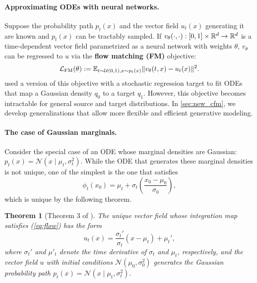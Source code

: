 \documentclass[10pt]{article}
\theoremstyle{plain}
\newtheorem{theorem}{Theorem}[section]
\theoremstyle{definition}
\theoremstyle{remark}
\newcommand{\LFM}[0]{\gL_{\rm FM}}
\begin{document}
\paragraph{Approximating ODEs with neural networks.} Suppose the probability path $p_t(x)$ and the vector field $u_t(x)$ generating it are known and $p_t(x)$ can be tractably sampled. If $v_\theta(\cdot,\cdot):[0,1]\times\mathbb{R}^d\to\mathbb{R}^d$ is a time-dependent vector field parametrized as a neural network with weights $\theta$, $v_\theta$ can be regressed to $u$ via the \textbf{flow matching (FM)} objective:
\begin{equation}\label{eq:fm}
\LFM(\theta) := \E_{t\sim {\gU(0,1)},x\sim p_t(x)} \| v_\theta(t, x) - u_t(x) \|^2.
\end{equation}
\citet{lipman_flow_2022} used a version of this objective with a stochastic regression target to fit ODEs that map a Gaussian density $q_0$ to a target $q_1$. However, this objective becomes intractable for general source and target distributions. In \autoref{sec:new_cfm}, we develop generalizations that allow more flexible and efficient generative modeling.

\paragraph{The case of Gaussian marginals.}
Consider the special case of an ODE whose marginal densities are Gaussian: $p_t(x) = \mathcal{N}(x \mid \mu_t, \sigma_t^2)$. While the ODE that generates these marginal densities is not unique, one of the simplest is the one that satisfies
\begin{equation}\label{eq:flow}
\phi_t(x_0) = \mu_t + \sigma_t \left(\frac{x_0-\mu_0}{\sigma_0}\right),
\end{equation}
which is unique by the following theorem.
\begin{theorem}[Theorem 3 of \citet{lipman_flow_2022}]\label{thm:gaussian_flow}
The unique vector field whose integration map satisfies (\ref{eq:flow}) has the form
\begin{equation}\label{eq:gaussian_ut}
u_t(x) = \frac{\sigma_t'}{\sigma_t} (x - \mu_t) + \mu_t',
\end{equation}
where $\sigma_t'$ and $\mu'_t$ denote the time derivative of $\sigma_t$ and $\mu_t$, respectively, and the vector field $u$ with initial conditions $\mathcal{N}(\mu_0,\sigma_0^2)$ generates the Gaussian probability path $p_t(x)=\mathcal{N}(x \mid \mu_t, \sigma_t^2)$.
\end{theorem}
\end{document}
